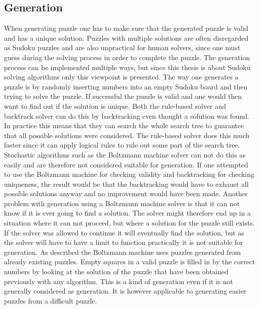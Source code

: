 \documentclass[a4paper,11pt]{kth-mag}
\begin{document}
\subsection{Generation}
When generating puzzle one has to make sure that the generated puzzle is valid and has a unique solution.
Puzzles with multiple solutions are often disregarded as Sudoku puzzles and are also unpractical for human solvers, since one must guess during the solving process in order to complete the puzzle.
The generation process can be implemented multiple ways, but since this thesis is about Sudoku solving algorithms only this viewpoint is presented.
The way one generates a puzzle is by randomly inserting numbers into an empty Sudoku board and then trying to solve the puzzle. If successful the puzzle is valid and one would then want to find out if the solution is unique. 
Both the rule-based solver and backtrack solver can do this by backtracking even thought a solution was found.
In practice this means that they can search the whole search tree to guarantee that all possible solutions were considered.
The rule-based solver does this much faster since it can apply logical rules to rule out some part of the search tree.
Stochastic algorithms such as the Boltzmann machine solver can not do this as easily and are therefore not considered suitable for generation.
If one attempted to use the Boltzmann machine for checking validity and backtracking for checking uniqueness, the result would be that the backtracking would have to exhaust all possible solutions anyway and no improvement would have been made.
Another problem with generation using a Boltzmann machine solver is that it can not know if it is ever going to find a solution.
The solver might therefore end up in a situation where it can not proceed, but where a solution for the puzzle still exists.
If the solver was allowed to continue it will eventually find the solution, but as the solver will have to have a limit to function practically it is not suitable for generation.
As described the Boltzmann machine uses puzzles generated from already existing puzzles.
Empty squares in a valid puzzle is filled in by the correct numbers by looking at the solution of the puzzle that have been obtained previously with any algorithm.
This is a kind of generation even if it is not generally considered as generation.
It is however applicable to generating easier puzzles from a difficult puzzle.
\end{document}
